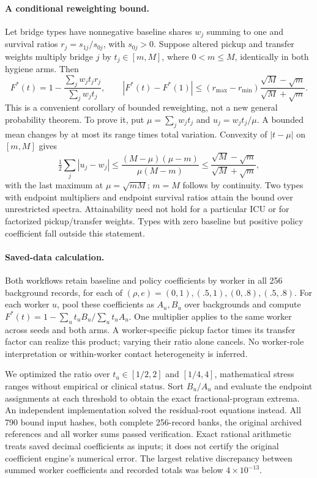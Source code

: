\documentclass[11pt]{article}
\begin{document}
\paragraph{A conditional reweighting bound.}
Let bridge types have nonnegative baseline shares $w_j$ summing to one and
survival ratios $r_j=s_{1j}/s_{0j}$, with $s_{0j}>0$. Suppose altered pickup and
transfer weights multiply bridge $j$ by $t_j\in[m,M]$, where $0<m\le M$,
identically in both hygiene arms. Then
\[
F^*(t)=1-\frac{\sum_jw_jt_jr_j}{\sum_jw_jt_j},\qquad
\left|F^*(t)-F^*(1)\right|
\le (r_{\max}-r_{\min})
       \frac{\sqrt M-\sqrt m}{\sqrt M+\sqrt m}.
\]
This is a convenient corollary of bounded reweighting, not a new general
probability theorem. To prove it, put $\mu=\sum_jw_jt_j$ and
$u_j=w_jt_j/\mu$. A bounded mean changes by at most its range times total
variation. Convexity of $|t-\mu|$ on $[m,M]$ gives
\[
\tfrac12\sum_j|u_j-w_j|
\le\frac{(M-\mu)(\mu-m)}{\mu(M-m)}
\le\frac{\sqrt M-\sqrt m}{\sqrt M+\sqrt m},
\]
with the last maximum at $\mu=\sqrt{mM}$; $m=M$ follows by continuity.
Two types with endpoint multipliers and endpoint survival ratios attain the
bound over unrestricted spectra. Attainability need not hold for a particular
ICU or for factorized pickup/transfer weights. Types with zero baseline but
positive policy coefficient fall outside this statement.

\paragraph{Saved-data calculation.}
Both workflows retain baseline and policy coefficients by worker in all 256
background records, for each of $(\rho,e)=(0,1),(.5,1),(0,.8),(.5,.8)$.
For each worker $u$, pool these coefficients as $A_u,B_u$ over backgrounds and
compute $F^*(t)=1-\sum_ut_uB_u/\sum_ut_uA_u$. One multiplier applies to the same
worker across seeds and both arms. A worker-specific pickup factor times its
transfer factor can realize this product; varying their ratio alone cancels.
No worker-role interpretation or within-worker contact heterogeneity is inferred.

We optimized the ratio over $t_u\in[1/2,2]$ and $[1/4,4]$, mathematical stress
ranges without empirical or clinical status. Sort $B_u/A_u$ and evaluate the
endpoint assignments at each threshold to obtain the exact fractional-program
extrema. An independent implementation solved the residual-root equations
instead. All 790 bound input hashes, both complete 256-record banks, the original
archived references and all worker sums passed verification. Exact rational
arithmetic treats saved decimal coefficients as inputs; it does not certify the
original coefficient engine's numerical error. The largest relative discrepancy
between summed worker coefficients and recorded totals was below
$4\times10^{-13}$.
\end{document}

